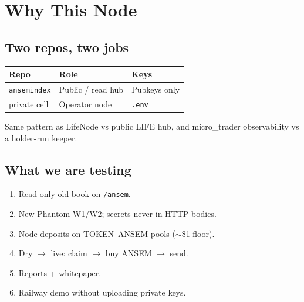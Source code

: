 \chapter{Why This Node}

\section{Two repos, two jobs}

\begin{center}
\begin{tabular}{@{}lll@{}}
\toprule
Repo & Role & Keys \\
\midrule
\texttt{ansemindex} & Public / read hub & Pubkeys only \\
private cell & Operator node & \texttt{.env} \\
\bottomrule
\end{tabular}
\end{center}

Same pattern as LifeNode vs public LIFE hub, and micro\_trader observability vs a holder-run keeper.

\section{What we are testing}

\begin{enumerate}
  \item Read-only old book on \texttt{/ansem}.
  \item New Phantom W1/W2; secrets never in HTTP bodies.
  \item Node deposits on TOKEN--ANSEM pools ($\sim$\$1 floor).
  \item Dry $\to$ live: claim $\to$ buy ANSEM $\to$ send.
  \item Reports + whitepaper.
  \item Railway demo without uploading private keys.
\end{enumerate}
